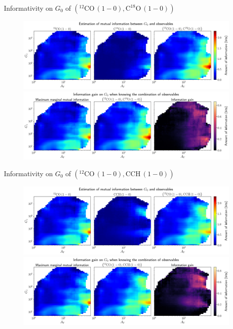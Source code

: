 \documentclass{beamer}
\begin{document}
\begin{frame}{Informativity on $G_0$ of $\left(\mathrm{^{12}CO\,(1-0)},\mathrm{C^{18}O\,(1-0)}\right)$}
    \begin{figure}
        \centering
        \includegraphics[width=0.95\linewidth]{../mi/g0__12co10_c18o10_mi.png}
        \vfill
        \includegraphics[width=0.95\linewidth]{../mi/g0__12co10_c18o10_mi_gain.png}
    \end{figure}
\end{frame}

\begin{frame}{Informativity on $G_0$ of $\left(\mathrm{^{12}CO\,(1-0)},\mathrm{CCH\,(1-0)}\right)$}
    \begin{figure}
        \centering
        \includegraphics[width=0.95\linewidth]{../mi/g0__12co10_cch10_mi.png}
        \vfill
        \includegraphics[width=0.95\linewidth]{../mi/g0__12co10_cch10_mi_gain.png}
    \end{figure}
\end{frame}
\end{document}
